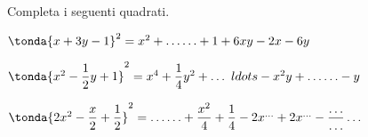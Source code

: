 \begin{esercizio}
\label{ese:11.11}
Completa i seguenti quadrati.

\begin{enumeratea}
\spazielenx
\item \(\tonda{x+3y-1}^{2}=x^{2}+\ldots \ldots +1+6xy-2x-6y\)
\item 
\(\tonda{x^{2}-\dfrac{1}{2}y+1}^{2}=x^{4}+\dfrac{1}{4}y^{2}+\ldots\
ldots -x^{2}y+\ldots\ldots -y\)
\item \(\tonda{2x^{2}-\dfrac{x}{2}+\dfrac{1}{2}}^{2}=\ldots\ldots 
+\dfrac{x^{2}}{4}%
+\dfrac{1}{4}-2x^{\ldots }+2x^{\ldots}-\dfrac{\ldots}{\ldots}\ldots \)
\end{enumeratea}
\end{esercizio}
% 
% 
% 
% 
% 

